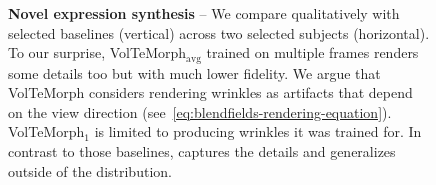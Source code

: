 \begin{figure}[htb]
  \centering
  \resizebox{\linewidth}{!}{
    \versionone
  }
  \caption[Novel expression synthesis capabilities of \blendfields]{\textbf{Novel expression synthesis} -- {
      We compare qualitatively \blendfields with selected baselines (vertical)
      across two selected subjects (horizontal).
      To our surprise, VolTeMorph$_\text{avg}$ trained on multiple frames renders
      some details too but with much lower fidelity.
      We argue that VolTeMorph considers rendering wrinkles as artifacts that depend
      on the view direction (see~\cref{eq:blendfields-rendering-equation}).
      VolTeMorph$_1$ is limited to producing wrinkles it was trained for.
      In contrast to those baselines, \textbf{\blendfields} captures the details and
      generalizes outside of the distribution.
    }}
  \label{fig:blendfields-qualitative-comparison}
\end{figure}